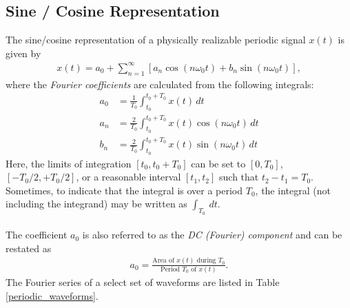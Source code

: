 \documentclass{report}
\begin{document}
\subsection{Sine / Cosine Representation}
The sine/cosine representation of a physically realizable periodic signal $x(t)$ is given by 
\begin{align}
    x(t) = a_0 + \sum_{n=1}^{\infty}[a_n\cos(n\omega_0 t)+b_n\sin(n\omega_0 t)],
\end{align}
where the \emph{Fourier coefficients} are calculated from the following integrals:
\begin{align}
    a_0 &= \frac{1}{T_0} \int_{t_0}^{t_0+T_0} x(t) \,dt \\
    a_n &= \frac{2}{T_0} \int_{t_0}^{t_0+T_0} x(t)\cos(n\omega_0 t) \,dt \\
    b_n &= \frac{2}{T_0} \int_{t_0}^{t_0+T_0} x(t)\sin(n\omega_0 t) \,dt
\end{align} 
Here, the limits of integration $[t_0, t_0+T_0]$ can be set to $[0,T_0]$, $[-T_0/2,+T_0/2]$, or a reasonable interval $[t_1,t_2]$ such that $t_2-t_1=T_0$. 
Sometimes, to indicate that the integral is over a period $T_0$, the integral (not including the integrand) may be written as $\int_{T_0} \,dt$.
\\ \\
The coefficient $a_0$ is also referred to as the \emph{DC (Fourier) component} and can be restated as
\begin{align}
    a_0 = \frac{\text{Area of } x(t) \text{ during } T_0}{\text{Period } T_0 \text{ of } x(t)}.
\end{align}
The Fourier series of a select set of waveforms are listed in Table \ref{periodic_waveforms}. 
\end{document}

